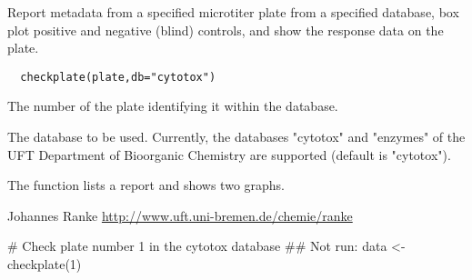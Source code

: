 \begin{Description}\relax
Report metadata from a specified microtiter plate from a specified database, box 
plot positive and negative (blind) controls, and show the response data on the 
plate.
\end{Description}
\begin{Usage}
\begin{verbatim}
  checkplate(plate,db="cytotox")
\end{verbatim}
\end{Usage}
\begin{Arguments}
\begin{ldescription}
\item[\code{plate}] The number of the plate identifying it within the database.
\item[\code{db}] The database to be used. Currently, the databases "cytotox" and "enzymes"
of the UFT Department of Bioorganic Chemistry are supported (default is
"cytotox").
\end{ldescription}
\end{Arguments}
\begin{Value}
The function lists a report and shows two graphs.
\end{Value}
\begin{Author}\relax
Johannes Ranke 
\url{http://www.uft.uni-bremen.de/chemie/ranke}
\end{Author}
\begin{Examples}
\begin{ExampleCode}
# Check plate number 1 in the cytotox database
## Not run: data <- checkplate(1)
\end{ExampleCode}
\end{Examples}

